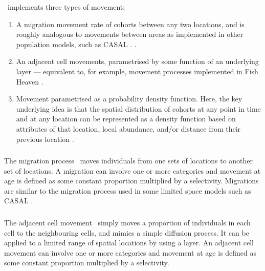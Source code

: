 \SPM\ implements three types of movement;
\begin{enumerate}
	\item  A migration movement rate of cohorts between any two locations, and is roughly analogous to movements between areas as implemented in other population models, such as CASAL \citep{1388}. \NYI.
	\item An adjacent cell movements, parametrised by some function of an underlying layer --- equivalent to, for example, movement processes implemented in Fish Heaven \citep{1136,1135}. \NYI
	\item Movement parametrised as a probability density function. Here, the key underlying idea is that the spatial distribution of cohorts at any point in time and at any location can be represented as a density function based on attributes of that location, local abundance, and/or distance from their previous location \citep{1366,1367}. 
\end{enumerate}

\subsubsection{}

The migration process \NYI\ moves individuals from one sets of locations to another set of locations. A migration can involve one or more categories and movement at age is defined as some constant proportion multiplied by a selectivity. Migrations are similar to the migration process used in some limited space models such as CASAL \citep{1388}.

\subsubsection{}

The adjacent cell movement \NYI\ simply moves a proportion of individuals in each cell to the neighbouring cells, and mimics a simple diffusion process. It can be applied to a limited range of spatial locations by using a layer. An adjacent cell movement can involve one or more categories and movement at age is defined as some constant proportion multiplied by a selectivity. 

\subsubsection{}

